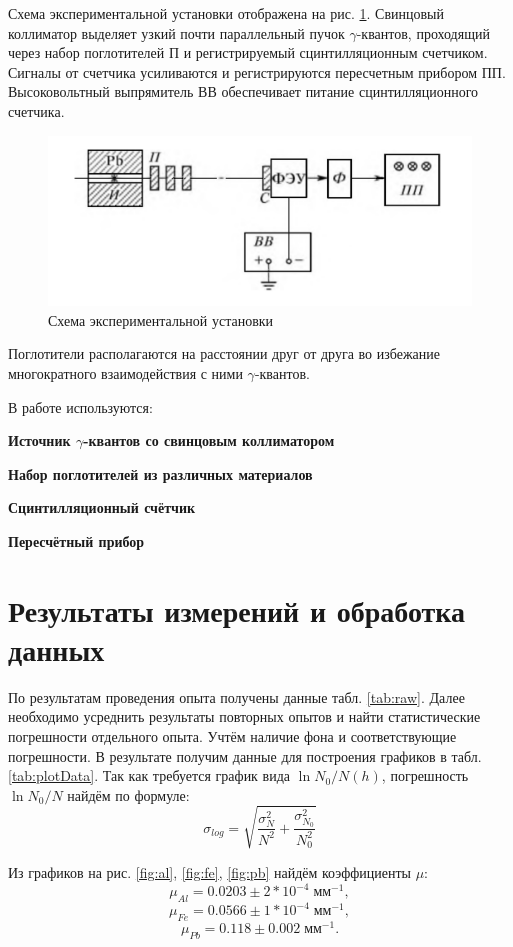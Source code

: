 \documentclass[a4paper]{article}
\newcommand{\equip}[1]{
	
	{\bf #1}}
\begin{document}
Схема экспериментальной установки отображена на рис. \ref{fig:screenshot2}.
Свинцовый коллиматор выделяет узкий почти параллельный пучок $ \gamma $-квантов, проходящий через набор поглотителей П и регистрируемый сцинтилляционным счетчиком. Сигналы от счетчика усиливаются и регистрируются пересчетным прибором ПП. Высоковольтный выпрямитель ВВ обеспечивает питание сцинтилляционного счетчика.
\begin{figure}
	\centering
	\includegraphics[width=1.0\linewidth]{Screenshot_2}
	\caption{Схема экспериментальной установки}
	\label{fig:screenshot2}
\end{figure}
Поглотители располагаются на расстоянии друг от друга во избежание многократного взаимодействия с ними $ \gamma $-квантов.

В работе используются:
\equip{Источник $ \gamma $-квантов со свинцовым коллиматором}
\equip{Набор поглотителей из различных материалов}
\equip{Сцинтилляционный счётчик}
\equip{Пересчётный прибор}

\section{Результаты измерений и обработка данных}

По результатам проведения опыта получены данные табл. \ref{tab:raw}. Далее необходимо усреднить результаты повторных опытов и найти статистические погрешности отдельного опыта. Учтём наличие фона и соответствующие погрешности. В результате получим данные для построения графиков в табл. \ref{tab:plotData}. Так как требуется график вида $ \ln N_0/N (h) $, погрешность $ \ln N_0/N $ найдём по формуле:
\begin{equation}\label{eq:погрLog}
	\sigma_{log} = \sqrt{\frac{\sigma _N^2}{N^2}+\frac{\sigma _{N_0}^2}{N_0^2}}
\end{equation}

Из графиков на рис. \ref{fig:al}, \ref{fig:fe}, \ref{fig:pb} найдём коэффициенты $ \mu $:
\[
	\mu_{Al} = 0.0203\pm 2*10^{-4} \; мм^{-1},
\]
\[
	\mu_{Fe} = 0.0566\pm 1*10^{-4} \; мм^{-1},
\]	
\[
	\mu_{Pb} = 0.118\pm 0.002 \; мм^{-1}.
\]
\end{document}
